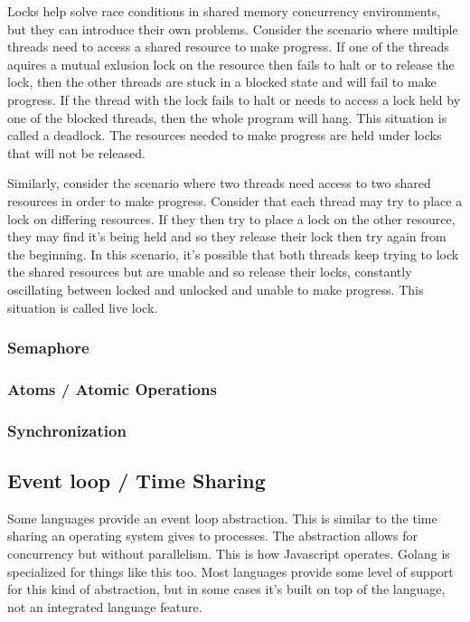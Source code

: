 \documentclass{article}
\begin{document}
Locks help solve race conditions in shared memory concurrency environments, but
they can introduce their own problems. Consider the scenario where multiple
threads need to access a shared resource to make progress. If one of the threads
aquires a mutual exlusion lock on the resource then fails to halt or to release
the lock, then the other threads are stuck in a blocked state and will fail to
make progress. If the thread with the lock fails to halt or needs to access a
lock held by one of the blocked threads, then the whole program will hang. This
situation is called a deadlock. The resources needed to make progress are held
under locks that will not be released.

Similarly, consider the scenario where two threads need access to two shared
resources in order to make progress. Consider that each thread may try to place
a lock on differing resources. If they then try to place a lock on the other
resource, they may find it's being held and so they release their lock then
try again from the beginning. In this scenario, it's possible that both threads
keep trying to lock the shared resources but are unable and so release their locks,
constantly oscillating between locked and unlocked and unable to make progress.
This situation is called live lock.

\subsubsection{Semaphore}
\subsubsection{Atoms / Atomic Operations}
\subsubsection{Synchronization}

\subsection{Event loop / Time Sharing}
Some languages provide an event loop abstraction. This is similar
to the time sharing an operating system gives to processes. The abstraction
allows for concurrency but without parallelism. This is how Javascript operates.
Golang is specialized for things like this too. Most languages provide some
level of support for this kind of abstraction, but in some cases it's built on
top of the language, not an integrated language feature.
\end{document}
